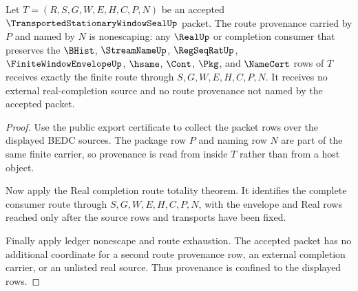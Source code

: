 \begin{theorem}
\label{thm:transported-stationary-window-seal-route-provenance-nonescape}
Let $T=(R,S,G,W,E,H,C,P,N)$ be an accepted $\TransportedStationaryWindowSealUp$ packet. The route provenance carried by $P$ and named by $N$ is nonescaping: any $\RealUp$ or completion consumer that preserves the $\BHist$, $\StreamNameUp$, $\RegSeqRatUp$, $\FiniteWindowEnvelopeUp$, $\hsame$, $\Cont$, $\Pkg$, and $\NameCert$ rows of $T$ receives exactly the finite route through $S,G,W,E,H,C,P,N$. It receives no external real-completion source and no route provenance not named by the accepted packet.
\end{theorem}
\begin{proof}
Use the public export certificate to collect the packet rows over the displayed BEDC sources. The package row $P$ and naming row $N$ are part of the same finite carrier, so provenance is read from inside $T$ rather than from a host object.

Now apply the Real completion route totality theorem. It identifies the complete consumer route through $S,G,W,E,H,C,P,N$, with the envelope and Real rows reached only after the source rows and transports have been fixed.

Finally apply ledger nonescape and route exhaustion. The accepted packet has no additional coordinate for a second route provenance row, an external completion carrier, or an unlisted real source. Thus provenance is confined to the displayed rows.
\end{proof}

